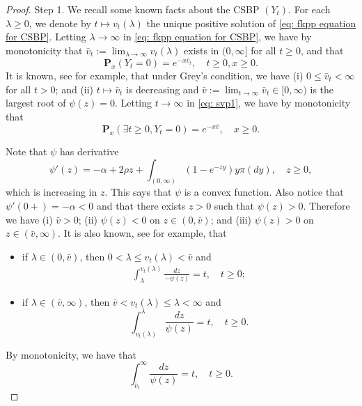 \documentclass[12pt,a4paper]{amsart}
\theoremstyle{plain}
\theoremstyle{definition}
\numberwithin{equation}{section}
\begin{document}
\begin{proof}
  Step 1. We recall some known facts about the CSBP $(Y_t)$.
  For each $\lambda \geq 0$, we denote by $t\mapsto v_t(\lambda)$ the unique positive solution of \eqref{eq: fkpp equation for CSBP}.
  Letting $\lambda \to \infty$ in \eqref{eq: fkpp equation for CSBP}, we have by monotonicity that $\bar v_t:= \lim_{\lambda \to \infty}v_t(\lambda)$ exists in $(0,\infty]$ for all $t\geq 0$, and that
  \begin{equation}
    \label{eq: svp1}
    \mathbf P_x(Y_t = 0)=e^{-x\bar v_t}, \quad t\geq 0, x\ge 0.
  \end{equation}
  It is known, see \cite[Theorems 3.5--3.8]{Li2011Measure-valued} for example, that under Grey's condition, we have (i) $0\leq \bar v_t < \infty$ for all $t>0$; and (ii) $t\mapsto \bar v_t$ is decreasing and $\bar v:= \lim_{t\to \infty} \bar v_t \in [0,\infty)$ is the largest root of $\psi(z) = 0$.
  Letting $t \to \infty$ in \eqref{eq: svp1}, we have by monotonicity that
  \[
    \mathbf P_x(\exists t \geq 0, Y_t = 0)
    = e^{-x\bar v}, \quad x\geq 0.
  \]
  
  Note that $\psi$ has derivative
  \[
    \psi'(z)
    = -\alpha + 2\rho z + \int_{(0,\infty)}(1-e^{-zy})y\pi(dy),\quad z\geq 0,
  \]
  which is increasing in $z$.
  This says that $\psi$ is a convex function.
  Also notice that $\psi'(0+)=-\alpha <0$ and that there exists $z>0$ such that $\psi(z)>0$.
  Therefore we have (i) $\bar v > 0$; (ii) $\psi(z) < 0$ on $z\in (0,\bar v)$; and (iii) $\psi(z) > 0 $ on $z\in (\bar v, \infty)$.
  It is also known, see \cite[Proposition 3.3]{Li2011Measure-valued} for example, that
  \begin{itemize}
  \item
    if $\lambda \in (0,\bar v)$, then $0<\lambda \leq v_t(\lambda)<\bar v $ and
    \begin{align}
      \label{CSBP: int}
    \int_{\lambda}^{v_t(\lambda)} \frac{dz}{-\psi(z)} = t, \quad t\geq 0;
    \end{align}
  \item
    if $\lambda \in (\bar v, \infty)$, then $\bar v < v_t(\lambda)\leq \lambda< \infty $ and
    \[
      \int_{v_t(\lambda)}^\lambda\frac{dz}{\psi(z)} = t, \quad t\geq 0.
    \]
  \end{itemize}
  By monotonicity, we have that
  \begin{equation}
    \label{eq:svp2}
    \int_{\bar v_t}^\infty \frac{dz}{\psi(z)} = t, \quad t\geq 0.
  \end{equation} 
    

\end{proof}
\end{document}
